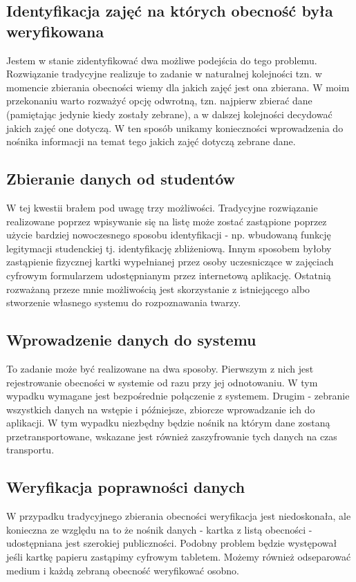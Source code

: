 \documentclass[declaration,shortabstract, mgr]{iithesis}
\begin{document}
\subsection{Identyfikacja zajęć na których obecność była weryfikowana}
Jestem w stanie zidentyfikować dwa możliwe podejścia do tego problemu. Rozwiązanie tradycyjne realizuje to zadanie w naturalnej kolejności tzn. w momencie zbierania obecności wiemy dla jakich zajęć jest ona zbierana. W moim przekonaniu warto rozważyć opcję odwrotną, tzn. najpierw zbierać dane (pamiętając jedynie kiedy zostały zebrane), a w dalszej kolejności decydować jakich zajęć one dotyczą. W ten sposób unikamy konieczności wprowadzenia do nośnika informacji na temat tego jakich zajęć dotyczą zebrane dane.
\subsection{Zbieranie danych od studentów}
W tej kwestii brałem pod uwagę trzy możliwości. Tradycyjne rozwiązanie realizowane poprzez wpisywanie się na listę może zostać zastąpione poprzez użycie bardziej nowoczesnego sposobu identyfikacji - np. wbudowaną funkcję legitymacji studenckiej tj. identyfikację zbliżeniową. Innym sposobem byłoby zastąpienie fizycznej kartki wypełnianej przez osoby uczesniczące w zajęciach cyfrowym formularzem udostępnianym przez internetową aplikację. Ostatnią rozważaną przeze mnie możliwością jest skorzystanie z istniejącego albo stworzenie własnego systemu do rozpoznawania twarzy.
\subsection{Wprowadzenie danych do systemu}
To zadanie może być realizowane na dwa sposoby. Pierwszym z nich jest rejestrowanie obecności w systemie od razu przy jej odnotowaniu. W tym wypadku wymagane jest bezpośrednie połączenie z systemem. Drugim - zebranie wszystkich danych na wstępie i późniejsze, zbiorcze wprowadzanie ich do aplikacji. W tym wypadku niezbędny będzie nośnik na którym dane zostaną przetransportowane, wskazane jest również zaszyfrowanie tych danych na czas transportu.
\subsection{Weryfikacja poprawności danych}
W przypadku tradycyjnego zbierania obecności weryfikacja jest niedoskonała, ale konieczna ze względu na to że nośnik danych - kartka z listą obecności - udostępniana jest szerokiej publiczności. Podobny problem będzie występował jeśli kartkę papieru zastąpimy cyfrowym tabletem. Możemy również odseparować medium i każdą zebraną obecność weryfikować osobno.
\end{document}
